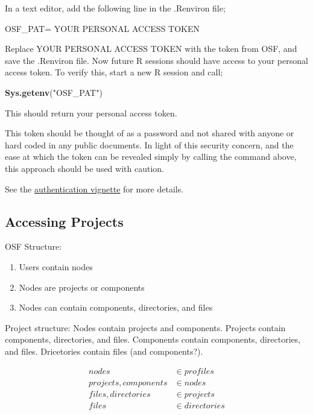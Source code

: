 \documentclass[]{article}
\newenvironment{Shaded}{\begin{snugshade}}{\end{snugshade}}
\newcommand{\KeywordTok}[1]{\textcolor[rgb]{0.13,0.29,0.53}{\textbf{#1}}}
\newcommand{\StringTok}[1]{\textcolor[rgb]{0.31,0.60,0.02}{#1}}
\newcommand{\VariableTok}[1]{\textcolor[rgb]{0.00,0.00,0.00}{#1}}
\newcommand{\ExtensionTok}[1]{#1}
\newcommand{\NormalTok}[1]{#1}
\begin{document}
In a text editor, add the following line in the .Renviron file;

\begin{Shaded}
\begin{Highlighting}[]
\VariableTok{OSF_PAT=} \ExtensionTok{YOUR}\NormalTok{ PERSONAL ACCESS TOKEN}
\end{Highlighting}
\end{Shaded}

Replace YOUR PERSONAL ACCESS TOKEN with the token from OSF, and save the
.Renviron file. Now future R sessions should have access to your
personal access token. To verify this, start a new R session and call;

\begin{Shaded}
\begin{Highlighting}[]
\KeywordTok{Sys.getenv}\NormalTok{(}\StringTok{"OSF_PAT"}\NormalTok{)}
\end{Highlighting}
\end{Shaded}

This should return your personal access token.

This token should be thought of as a password and not shared with anyone
or hard coded in any public documents. In light of this security
concern, and the ease at which the token can be revealed simply by
calling the command above, this approach should be used with caution.

See the
\href{http://centerforopenscience.github.io/osfr/reference/osf_auth.html}{\color{blue}authentication vignette}
for more details.

\subsection{Accessing Projects}

OSF Structure:

\begin{enumerate}
\item Users contain nodes
\item Nodes are projects or components
\item Nodes can contain components, directories, and files
\end{enumerate}

Project structure: Nodes contain projects and components. Projects
contain components, directories, and files. Components contain
components, directories, and files. Dricetories contain files (and
components?).

\[
\begin{aligned}
nodes &\in profiles \\
projects,components &\in nodes \\
files,directories &\in projects \\
files &\in directories 
\end{aligned}
\]
\end{document}
